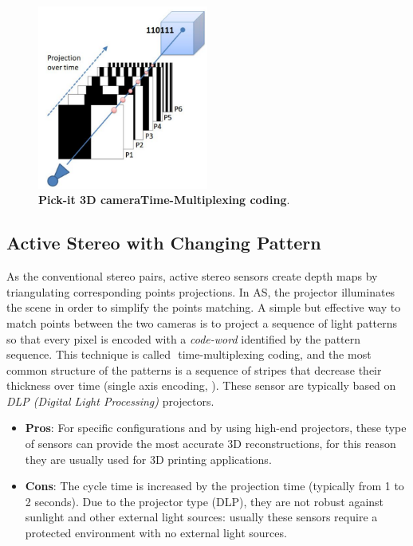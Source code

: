 \begin{figure}
    \centering
    \includegraphics[width=0.5\textwidth]{figures/1_perception_and_sensing_in_robotics/time_multiplexing_coding}
    \caption{\textbf{Pick-it 3D cameraTime-Multiplexing coding}.} 
    \label{fig:time_multiplexing_coding}
\end{figure}

\subsection{Active Stereo with Changing Pattern}\label{subsec:ac_stereo_changing_pattern}
As the conventional stereo pairs, active stereo sensors create depth maps by triangulating corresponding points projections. In AS, the projector illuminates the scene in order to simplify the points matching. A simple but effective way to match points between the two cameras is to project a sequence of light patterns so that every pixel is encoded with a \emph{code-word} identified by the pattern sequence. This technique is called ​ time-multiplexing coding, and the most common structure of the patterns is a sequence of stripes that decrease their thickness over time (single axis encoding, ). These sensor are typically based on \emph{DLP (Digital Light Processing)} projectors.

\begin{itemize}
	\item \textbf{Pros}: For specific configurations and by using high-end projectors, these type of sensors can provide the most accurate 3D reconstructions, for this reason they are usually used for 3D printing applications.
	\item \textbf{Cons}: The cycle time is increased by the projection time (typically from 1 to 2 seconds). Due to the projector type (DLP), they are not robust against sunlight and other external light sources: usually these sensors require a protected environment with no external light sources.
\end{itemize}

